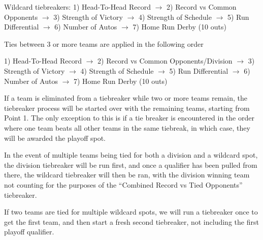 \begin{deepEnumerate}
\begin{deepEnumerate}
\begin{deepEnumerate}
\begin{deepEnumerate}
\begin{deepEnumerate}
					\item Wildcard tiebreakers: 
					1) Head-To-Head Record $\rightarrow$  
					2) Record vs Common Opponents $\rightarrow$ 
					3) Strength of Victory $\rightarrow$ 
					4) Strength of Schedule $\rightarrow$ 
					5) Run Differential $\rightarrow$  
					6) Number of Autos $\rightarrow$  
					7) Home Run Derby (10 outs)
				\end{deepEnumerate}
				\item Ties between 3 or more teams are applied in the following order
				\begin{deepEnumerate}
					\item 1) Head-To-Head Record $\rightarrow$  
					2) Record vs Common Opponents/Division $\rightarrow$ 
					3) Strength of Victory $\rightarrow$ 
					4) Strength of Schedule $\rightarrow$ 
					5) Run Differential $\rightarrow$  
					6) Number of Autos $\rightarrow$  
					7) Home Run Derby (10 outs)
					\item If a team is eliminated from a tiebreaker while two or more teams remain, 
					the tiebreaker process will be started over with the remaining teams, starting from Point 1.  The only exception to this is if a tie breaker is encountered in the order where one team beats all other teams in the same tiebreak, in which case, they will be awarded the playoff spot.
				\end{deepEnumerate}
				\item In the event of multiple teams being tied for both a division and a wildcard spot, 
				the division tiebreaker will be run first, 
				and once a qualifier has been pulled from there, 
				the wildcard tiebreaker will then be ran, 
				with the division winning team not counting 
				for the purposes of the “Combined Record vs Tied Opponents” tiebreaker.
				\item If two teams are tied for multiple wildcard spots, 
				we will run a tiebreaker once to get the first team, 
				and then start a fresh second tiebreaker, 
				not including the first playoff qualifier.
			\end{deepEnumerate}
		\end{deepEnumerate}
	\end{deepEnumerate}
\end{deepEnumerate}
